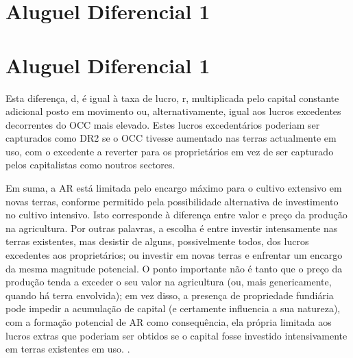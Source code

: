 \section{Aluguel Diferencial 1}
 \par 
\section{Aluguel Diferencial 1}
 \par 
Esta diferença, d, é igual à taxa de lucro, r, multiplicada pelo capital constante adicional posto em movimento ou, alternativamente, igual aos lucros excedentes decorrentes do OCC mais elevado. Estes lucros excedentários poderiam ser capturados como DR2 se o OCC tivesse aumentado nas terras actualmente em uso, com o excedente a reverter para os proprietários em vez de ser capturado pelos capitalistas como noutros sectores.
 \par 
Em suma, a AR está limitada pelo encargo máximo para o cultivo extensivo em novas terras, conforme permitido pela possibilidade alternativa de investimento no cultivo intensivo. Isto corresponde à diferença entre valor e preço da produção na agricultura. Por outras palavras, a escolha é entre investir intensamente nas terras existentes, mas desistir de alguns, possivelmente todos, dos lucros excedentes aos proprietários; ou investir em novas terras e enfrentar um encargo da mesma magnitude potencial. O ponto importante não é tanto que o preço da produção tenda a exceder o seu valor na agricultura (ou, mais genericamente, quando há terra envolvida); em vez disso, a presença de propriedade fundiária pode impedir a acumulação de capital (e certamente influencia a sua natureza), com a formação potencial de AR como consequência, ela própria limitada aos lucros extras que poderiam ser obtidos se o capital fosse investido intensivamente em terras existentes em uso. .
 \par 
